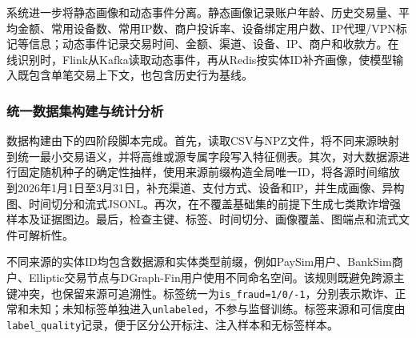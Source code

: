 系统进一步将静态画像和动态事件分离。静态画像记录账户年龄、历史交易量、平均金额、常用设备数、常用IP数、商户投诉率、设备绑定用户数、IP代理/VPN标记等信息；动态事件记录交易时间、金额、渠道、设备、IP、商户和收款方。在线识别时，Flink从Kafka读取动态事件，再从Redis按实体ID补齐画像，使模型输入既包含单笔交易上下文，也包含历史行为基线。

\subsubsection{统一数据集构建与统计分析}

数据构建由下的四阶段脚本完成。首先，读取CSV与NPZ文件，将不同来源映射到统一最小交易语义，并将高维或源专属字段写入特征侧表。其次，对大数据源进行固定随机种子的确定性抽样，使用来源前缀构造全局唯一ID，将各源时间缩放到2026年1月1日至3月31日，补充渠道、支付方式、设备和IP，并生成画像、异构图、时间切分和流式JSONL。再次，在不覆盖基础集的前提下生成七类欺诈增强样本及证据图边。最后，检查主键、标签、时间切分、画像覆盖、图端点和流式文件可解析性。

不同来源的实体ID均包含数据源和实体类型前缀，例如PaySim用户、BankSim商户、Elliptic交易节点与DGraph-Fin用户使用不同命名空间。该规则既避免跨源主键冲突，也保留来源可追溯性。标签统一为\texttt{is\_fraud=1/0/-1}，分别表示欺诈、正常和未知；未知标签单独进入\texttt{unlabeled}，不参与监督训练。标签来源和可信度由\texttt{label\_quality}记录，便于区分公开标注、注入样本和无标签样本。

